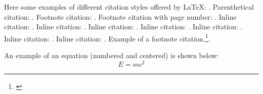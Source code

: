 \documentclass[12pt,a4paper]{cau_thesis}
\begin{document}
Here some examples of different citation styles offered by \LaTeX:
\textcite{antonio2022inflation}. Parenthetical citation:
\parencite{antonio2022inflation}. Footnote citation:
\autocite{antonio2022inflation}. Footnote citation with page number:
\autocite[1]{antonio2022inflation}. Inline citation:
\textcite{rosenberg_2003_exchange_rate_determination}. Inline
citation: \textcite{antonio2022inflation}. Inline citation:
\textcite{seabold2010statsmodels}. Inline citation:
\textcite{seabold2010statsmodels}. Inline citation:
\textcite{fama2016commodity}. Inline citation:
\textcite{rosenberg_2003_exchange_rate_determination}. Inline
citation: \textcite{fama2016commodity}. Example of a footnote
citation.\footnote{\cite{fama2016commodity}}.

An example of an equation (numbered and centered) is shown below:
\begin{equation}
    E = mc^2
\end{equation}
% 
% 
% 
% 
\end{document}
